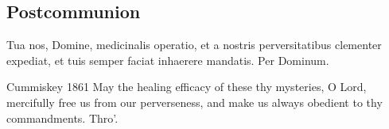 \subsection{Postcommunion}\label{proper-postcommunion}
\begin{latinproper}
Tua nos, Domine, medicinalis operatio, et a nostris perversitatibus clementer expediat, et tuis semper faciat inhaerere mandatis. Per Dominum.
\end{latinproper}
\begin{englishwitness}{Cummiskey 1861}
May the healing efficacy of these thy mysteries, O Lord, mercifully free us from our perverseness, and make us always obedient to thy commandments. Thro’.
\end{englishwitness}
